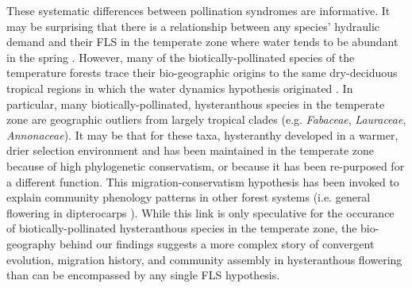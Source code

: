 \documentclass{article}
\begin{document}
\noindent These systematic differences between pollination syndromes are informative. It may be surprising that there is a relationship between any species' hydraulic demand and their FLS in the temperate zone where water tends to be abundant in the spring \citep{Polgar2011}. However, many of the biotically-pollinated species of the temperature forests trace their bio-geographic origins to the same dry-deciduous tropical regions \citep{Daubenmire1972} in which the water dynamics hypothesis originated \citep{Janzen1967,Franklin2016}. In particular, many biotically-pollinated, hysteranthous species in the temperate zone are geographic outliers from largely tropical clades (e.g. \textit{Fabaceae}, \textit{Lauraceae}, \textit{Annonaceae}). It may be that for these taxa, hysteranthy developed in a warmer, drier selection environment and has been maintained in the temperate zone because of high phylogenetic conservatism, or because it has been re-purposed for a different function. %
This migration-conservatism hypothesis has been invoked to explain community phenology patterns in other forest systems (i.e. general flowering in dipterocarps \citep{Ashton1988, Kurten2018}). While this link is only speculative for the occurance of biotically-pollinated hysteranthous species in the temperate zone, the bio-geography behind our findings suggests a more complex story of convergent evolution, migration history, and community assembly in hysteranthous flowering than can be encompassed by any single FLS hypothesis.\\


\end{document}

